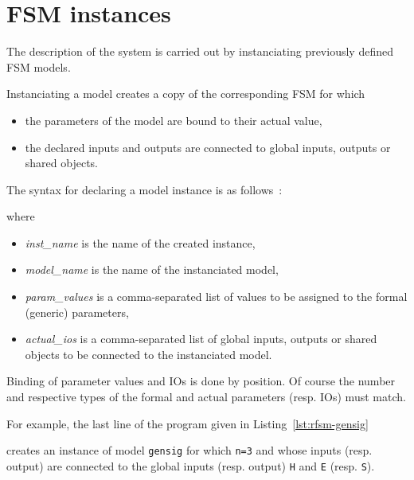 \section{FSM instances}
\label{sec:fsm-instances}

The description of the system is carried out by instanciating
previously defined FSM models.

\medskip
Instanciating a model creates a copy of the corresponding FSM for which
\begin{itemize}
\item the parameters of the model are bound to their actual value,
\item the declared inputs and outputs are connected to global inputs, outputs or shared
  objects.
\end{itemize}

\medskip
The syntax for declaring a model instance is as follows~:

\begin{center}
\end{center}

where
\begin{itemize}
\item \emph{inst\_name} is the name of the created instance,
\item \emph{model\_name} is the name of the instanciated model,
\item \emph{param\_values} is a comma-separated list of values to be assigned to the formal
  (generic) parameters,
\item \emph{actual\_ios} is a comma-separated list of global inputs, outputs or shared objects to be
  connected to the instanciated model.
\end{itemize}

Binding of parameter values and IOs is done by position. Of course the number and respective types
of the formal and actual parameters (resp. IOs) must match.

\medskip
For example, the last line of the program given in Listing~\ref{lst:rfsm-gensig}

\begin{center}
\end{center}

creates an instance of model \verb|gensig| for which \verb|n=3| and whose inputs (resp. output) are
connected to the global inputs (resp. output) \texttt{H} and \texttt{E} (resp. \texttt{S}).

